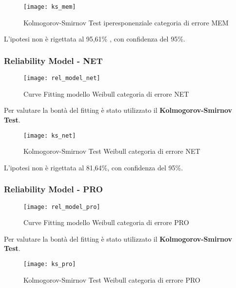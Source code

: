 \begin{figure}[!htbp]
  \centering
  \texttt{[image: ks\_mem]}
  \caption{Kolmogorov-Smirnov Test iperesponenziale categoria di errore MEM}
  \label{ffda_ks_mem}
\end{figure}

L'ipotesi non è rigettata al 95,61\% , con confidenza del 95\%.\\

\clearpage
\subsubsection*{Reliability Model - NET}

\begin{figure}[!htbp]
  \centering
  \texttt{[image: rel\_model\_net]}
  \caption{Curve Fitting modello Weibull categoria di errore NET}
  \label{ffda_rel_model_net}
\end{figure}

Per valutare la bontà del fitting è stato utilizzato il \textbf{Kolmogorov-Smirnov Test}.\\

\begin{figure}[!htbp]
  \centering
  \texttt{[image: ks\_net]}
  \caption{Kolmogorov-Smirnov Test Weibull categoria di errore NET}
  \label{ffda_ks_net}
\end{figure}

L'ipotesi non è rigettata al 81,64\%, con confidenza del 95\%.\\

\clearpage
\subsubsection*{Reliability Model - PRO}

\begin{figure}[!htbp]
  \centering
  \texttt{[image: rel\_model\_pro]}
  \caption{Curve Fitting modello Weibull categoria di errore PRO}
  \label{ffda_rel_model_pro}
\end{figure}

Per valutare la bontà del fitting è stato utilizzato il \textbf{Kolmogorov-Smirnov Test}.\\

\begin{figure}[!htbp]
  \centering
  \texttt{[image: ks\_pro]}
  \caption{Kolmogorov-Smirnov Test Weibull categoria di errore PRO}
  \label{ffda_ks_pro}
\end{figure}

